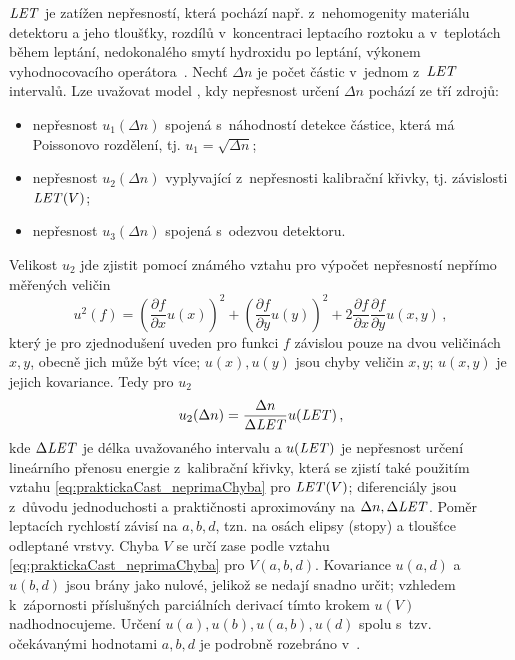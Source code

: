 $\mathit{LET}$ je zatížen nepřesností, která pochází např. z~nehomogenity materiálu detektoru a jeho tloušťky, rozdílů v~koncentraci leptacího roztoku a v~teplotách během leptání, nedokonalého smytí hydroxidu po leptání, výkonem vyhodnocovacího operátora~\cite{nejistoty}. Nechť $\Delta n$ je počet částic v~jednom z~$\mathit{LET}$ intervalů. Lze uvažovat model \cite{nejistoty}, kdy nepřesnost určení $\Delta n$ pochází ze tří zdrojů:
\begin{itemize}
  \item nepřesnost $u_1(\Delta n)$ spojená s~náhodností detekce částice, která má Poissonovo rozdělení, tj. $u_1=\sqrt{\Delta n}$;
  \item nepřesnost $u_2(\Delta n)$ vyplyvající z~nepřesnosti kalibrační křivky, tj. závislosti $\mathit{LET}(V)$;
  \item nepřesnost $u_3(\Delta n)$ spojená s~odezvou detektoru.
\end{itemize}
Velikost $u_2$ jde zjistit pomocí známého vztahu pro výpočet nepřesností nepřímo měřených veličin
\begin{equation}
  u^2(f)=\left(\frac{\partial f}{\partial x}u(x)\right)^2+\left( \frac{\partial f}{\partial y}u(y) \right)^2+2\frac{\partial f}{\partial x}\frac{\partial f}{\partial y}u(x,y)\,,
  \label{eq:praktickaCast_neprimaChyba}
\end{equation}
který je pro zjednodušení uveden pro funkci $f$ závislou pouze na dvou veličinách $x,y$, obecně jich může být více; $u(x), u(y)$ jsou chyby veličin $x,y$; $u(x,y)$ je jejich kovariance. Tedy pro $u_2$
\begin{equation}
  u_2(\Delta n)=\frac{\Delta n}{\Delta\mathit{LET}}u(\mathit{LET})\,,
  \label{eq:praktickaCast_u2}
\end{equation}
kde $\Delta\mathit{LET}$ je délka uvažovaného intervalu a $u(\mathit{LET})$ je nepřesnost určení lineárního přenosu energie z~kalibrační křivky, která se zjistí také použitím vztahu \eqref{eq:praktickaCast_neprimaChyba} pro $\mathit{LET}(V)$; diferenciály jsou z~důvodu jednoduchosti a praktičnosti aproximovány na $\Delta n, \Delta\mathit{LET}$. Poměr leptacích rychlostí závisí na $a,b,d$, tzn. na osách elipsy (stopy) a tloušťce odleptané vrstvy. Chyba $V$ se určí zase podle vztahu \eqref{eq:praktickaCast_neprimaChyba} pro $V(a,b,d)$. Kovariance $u(a,d)$ a $u(b,d)$ jsou brány jako nulové, jelikož se nedají snadno určit; vzhledem k~zápornosti příslušných parciálních derivací tímto krokem $u(V)$ nadhodnocujeme. Určení $u(a), u(b), u(a,b), u(d)$ spolu s~tzv. očekávanými hodnotami $a,b,d$ je podrobně
rozebráno v~\cite{nejistoty}.

